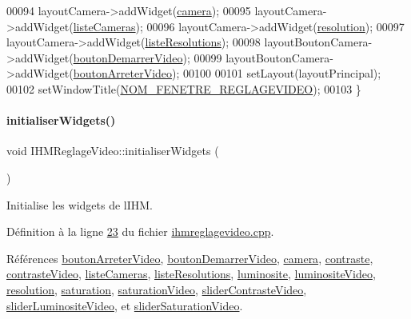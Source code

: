 \begin{DoxyCode}
00094     layoutCamera->addWidget(\hyperlink{class_i_h_m_reglage_video_a5a57047117d423ba8bf62bbcb2baee74}{camera});
00095     layoutCamera->addWidget(\hyperlink{class_i_h_m_reglage_video_a38a35548ddd0e5750917305ac6f32142}{listeCameras});
00096     layoutCamera->addWidget(\hyperlink{class_i_h_m_reglage_video_a7fd79309e9501b8cb340ae61b96c0366}{resolution});
00097     layoutCamera->addWidget(\hyperlink{class_i_h_m_reglage_video_ad897355a4350d95f5f219db57ff68d4f}{listeResolutions});
00098     layoutBoutonCamera->addWidget(\hyperlink{class_i_h_m_reglage_video_a98d33390551ab92165f192be44f6361d}{boutonDemarrerVideo});
00099     layoutBoutonCamera->addWidget(\hyperlink{class_i_h_m_reglage_video_a705db68dd445a91a4144a3c9bf95a9cf}{boutonArreterVideo});
00100 
00101     setLayout(layoutPrincipal);
00102     setWindowTitle(\hyperlink{ihmreglagevideo_8h_a4a739fa13f7cc257ce61e04383ed8a9a}{NOM\_FENETRE\_REGLAGEVIDEO});
00103 \}
\end{DoxyCode}
\mbox{\label{class_i_h_m_reglage_video_ad41172843e79eae9bb64048ec76b81e6}} 
\paragraph{\texorpdfstring{initialiser\+Widgets()}{initialiserWidgets()}}
{\footnotesize\ttfamily void I\+H\+M\+Reglage\+Video\+::initialiser\+Widgets (\begin{DoxyParamCaption}{ }\end{DoxyParamCaption})\hspace{0.3cm}{\ttfamily [private]}}



Initialise les widgets de l\textquotesingle{}I\+HM. 



Définition à la ligne \hyperlink{ihmreglagevideo_8cpp_source_l00023}{23} du fichier \hyperlink{ihmreglagevideo_8cpp_source}{ihmreglagevideo.\+cpp}.



Références \hyperlink{ihmreglagevideo_8h_source_l00042}{bouton\+Arreter\+Video}, \hyperlink{ihmreglagevideo_8h_source_l00041}{bouton\+Demarrer\+Video}, \hyperlink{ihmreglagevideo_8h_source_l00037}{camera}, \hyperlink{ihmreglagevideo_8h_source_l00032}{contraste}, \hyperlink{ihmreglagevideo_8h_source_l00035}{contraste\+Video}, \hyperlink{ihmreglagevideo_8h_source_l00038}{liste\+Cameras}, \hyperlink{ihmreglagevideo_8h_source_l00040}{liste\+Resolutions}, \hyperlink{ihmreglagevideo_8h_source_l00031}{luminosite}, \hyperlink{ihmreglagevideo_8h_source_l00034}{luminosite\+Video}, \hyperlink{ihmreglagevideo_8h_source_l00039}{resolution}, \hyperlink{ihmreglagevideo_8h_source_l00033}{saturation}, \hyperlink{ihmreglagevideo_8h_source_l00036}{saturation\+Video}, \hyperlink{ihmreglagevideo_8h_source_l00029}{slider\+Contraste\+Video}, \hyperlink{ihmreglagevideo_8h_source_l00028}{slider\+Luminosite\+Video}, et \hyperlink{ihmreglagevideo_8h_source_l00030}{slider\+Saturation\+Video}.



